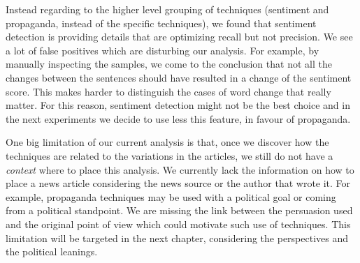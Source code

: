 Instead regarding to the higher level grouping of techniques (sentiment and propaganda, instead of the specific techniques), we found that sentiment detection is providing details that are optimizing recall but not precision. We see a lot of false positives which are disturbing our analysis.
For example, by manually inspecting the samples, we come to the conclusion that not all the changes between the sentences should have resulted in a change of the sentiment score.
This makes harder to distinguish the cases of word change that really matter. For this reason, sentiment detection might not be the best choice and in the next experiments we decide to use less this feature, in favour of propaganda.


One big limitation of our current analysis is that, once we discover how the techniques are related to the variations in the articles, we still do not have a \emph{context} where to place this analysis. We currently lack the information on how to place a news article considering the news source or the author that wrote it.
For example, propaganda techniques may be used with a political goal or coming from a political standpoint.
We are missing the link between the persuasion used and the original point of view which could motivate such use of techniques.
This limitation will be targeted in the next chapter, considering the perspectives and the political leanings.






